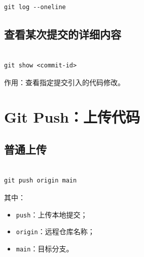 \begin{lstlisting}

git log --oneline

\end{lstlisting}







\subsection{查看某次提交的详细内容}



\begin{lstlisting}

git show <commit-id>

\end{lstlisting}



作用：查看指定提交引入的代码修改。










\section{Git Push：上传代码}



\subsection{普通上传}



\begin{lstlisting}

git push origin main

\end{lstlisting}



其中：



\begin{itemize}

    \item \texttt{push}：上传本地提交；

    \item \texttt{origin}：远程仓库名称；

    \item \texttt{main}：目标分支。

\end{itemize}



